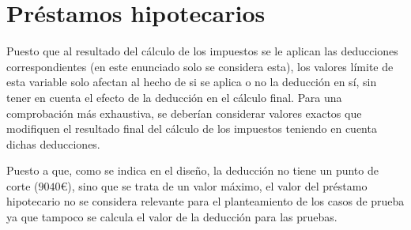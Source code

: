 \section{Préstamos hipotecarios}
Puesto que al resultado del cálculo de los impuestos se le aplican las deducciones correspondientes
(en este enunciado solo se considera esta), los valores límite de esta variable solo afectan al
hecho de si se aplica o no la deducción en sí, sin tener en cuenta el efecto de la deducción en el
cálculo final. Para una comprobación más exhaustiva, se deberían considerar valores exactos que
modifiquen el resultado final del cálculo de los impuestos teniendo en cuenta dichas deducciones.

Puesto a que, como se indica en el diseño, la deducción no tiene un punto de corte ($9040$€), sino que
se trata de un valor máximo, el valor del préstamo hipotecario no se considera relevante para el
planteamiento de los casos de prueba ya que tampoco se calcula el valor de la deducción para las pruebas.
